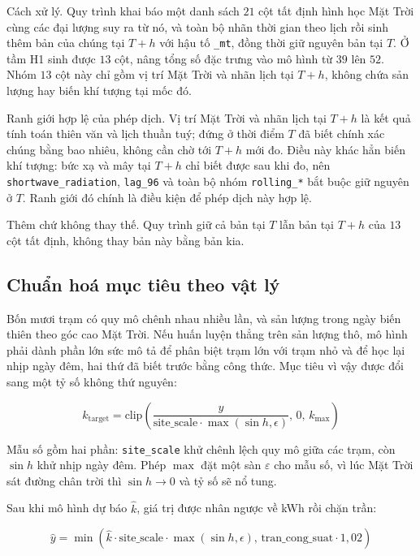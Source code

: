 \documentclass[12pt, a4paper]{report}
\begin{document}
Cách xử lý. Quy trình khai báo một danh sách $21$ cột tất định hình học
Mặt Trời cùng các đại lượng suy ra từ nó, và toàn bộ nhãn thời gian theo lịch rồi sinh thêm
bản của chúng tại $T{+}h$ với hậu tố \texttt{\_mt}, đồng thời giữ nguyên bản tại $T$. Ở
tầm H1 sinh được $13$ cột, nâng tổng số đặc trưng vào mô hình từ $39$ lên $52$. Nhóm $13$ cột này chỉ gồm vị trí Mặt Trời và nhãn lịch tại $T{+}h$, không chứa sản lượng hay biến khí tượng tại mốc đó.

Ranh giới hợp lệ của phép dịch. Vị trí Mặt Trời và nhãn lịch tại
$T{+}h$ là kết quả tính toán thiên văn và lịch thuần tuý; đứng ở thời điểm $T$ đã biết chính
xác chúng bằng bao nhiêu, không cần chờ tới $T{+}h$ mới đo. Điều này khác hẳn biến khí tượng:
bức xạ và mây tại $T{+}h$ chỉ biết được sau khi đo, nên \texttt{shortwave\_radiation},
\texttt{lag\_96} và toàn bộ nhóm \texttt{rolling\_*} bắt buộc giữ nguyên ở $T$. Ranh giới đó chính là
điều kiện để phép dịch này hợp lệ.

Thêm chứ không thay thế. Quy trình giữ cả bản tại $T$ lẫn bản tại $T{+}h$
của $13$ cột tất định, không thay bản này bằng bản kia.

\FloatBarrier
\subsection{Chuẩn hoá mục tiêu theo vật lý}
\label{subsec:chuan_hoa_muc_tieu}

Bốn mươi trạm có quy mô chênh nhau nhiều lần, và sản lượng trong ngày biến thiên theo góc cao
Mặt Trời. Nếu huấn luyện thẳng trên sản lượng thô, mô hình phải dành phần lớn sức mô tả để
phân biệt trạm lớn với trạm nhỏ và để học lại nhịp ngày đêm, hai thứ đã biết trước bằng
công thức. Mục tiêu vì vậy được đổi sang một tỷ số không thứ nguyên:

\begin{equation}
k_{\text{target}} = \text{clip}\left(\frac{y}{\text{site\_scale} \cdot \max(\sin h, \epsilon)},\, 0,\, k_{\max}\right)
\end{equation}

Mẫu số gồm hai phần: \texttt{site\_scale} khử chênh lệch quy mô giữa các trạm, còn $\sin h$ khử
nhịp ngày đêm. Phép $\max$ đặt một sàn $\varepsilon$ cho mẫu số, vì lúc Mặt Trời sát đường
chân trời thì $\sin h \to 0$ và tỷ số sẽ nổ tung.

Sau khi mô hình dự báo $\hat{k}$, giá trị được nhân ngược về kWh rồi chặn trần:

\begin{equation}
\hat{y} = \min\left(\hat{k} \cdot \text{site\_scale} \cdot \max(\sin h, \epsilon),\, \text{tran\_cong\_suat} \cdot 1{,}02\right)
\end{equation}
\end{document}
